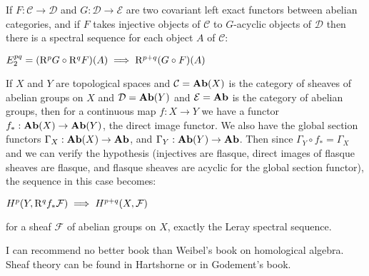\documentclass[12pt]{article}
\begin{document}
If $F :\mathcal{C}\to\mathcal{D}$ and $G :\mathcal{D}\to\mathcal{E}$ are two covariant left exact functors between abelian categories, and if $F$ takes injective objects of $\mathcal{C}$ to $G$-acyclic objects of $\mathcal{D}$ then there is a spectral sequence for each object $A$ of $\mathcal{C}$:

$E_2^{pq} = ({\rm R}^p G \circ{\rm R}^q F)(A) \implies {\rm R}^{p+q} (G\circ F)(A)$

If $X$ and $Y$ are topological spaces and $\mathcal{C} = {\bf Ab}(X)$ is the category of sheaves of abelian groups on $X$ and $\mathcal{D} = {\bf Ab}(Y)$ and $\mathcal{E} = {\bf Ab}$ is the category of abelian groups, then for a continuous map $f : X \to Y$ we have a functor $f_* : {\bf Ab}(X) \to {\bf Ab}(Y)$, the direct image functor.  We also have the global section functors $\Gamma_X : {\bf Ab}(X)\to {\bf Ab}$, and $\Gamma_Y : {\bf Ab}(Y) \to {\bf Ab}$.  Then since $\Gamma_Y \circ f_* = \Gamma_X$ and we can verify the hypothesis (injectives are flasque, direct images of flasque sheaves are flasque, and flasque sheaves are acyclic for the global section functor), the sequence in this case becomes:

$H^p(Y,{\rm R}^q f_*\mathcal{F})\implies H^{p+q}(X,\mathcal{F})$

for a sheaf $\mathcal{F}$ of abelian groups on $X$, exactly the Leray spectral sequence.

I can recommend no better book than Weibel's book on homological algebra.  Sheaf theory can be found in Hartshorne or in Godement's book.
\end{document}
